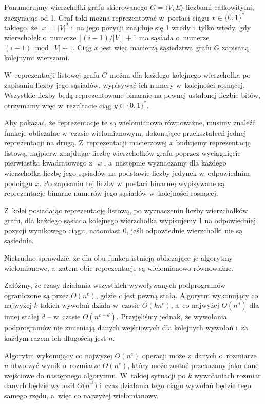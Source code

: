 \exercise %
Ponumerujmy wierzchołki grafu skierowanego $G=\langle V,E\rangle$ liczbami całkowitymi, zaczynając od 1.
Graf taki można reprezentować w~postaci ciągu $x\in\{0,1\}^*$ takiego, że $|x|=|V|^2$ i~na  jego pozycji znajduje się 1 wtedy i~tylko wtedy, gdy wierzchołek o~numerze $\lfloor(i-1)/|V|\rfloor+1$ ma sąsiada o~numerze $(i-1)\bmod|V|+1$.
Ciąg $x$ jest więc macierzą sąsiedztwa grafu $G$ zapisaną kolejnymi wierszami.

W~reprezentacji listowej grafu $G$ można dla każdego kolejnego wierzchołka po zapisaniu liczby jego sąsiadów, wypisywać ich numery w~kolejności rosnącej.
Wszystkie liczby będą reprezentowane binarnie na pewnej ustalonej liczbie bitów, otrzymamy więc w~rezultacie ciąg $y\in\{0,1\}^*$.

Aby pokazać, że reprezentacje te są wielomianowo równoważne, musimy znaleźć funkcje obliczalne w~czasie wielomianowym, dokonujące przekształceń jednej reprezentacji na drugą.
Z~reprezentacji macierzowej $x$ budujemy reprezentację listową, najpierw znajdując liczbę wierzchołków grafu poprzez wyciągnięcie pierwiastka kwadratowego z~$|x|$, a~następnie wyznaczamy dla każdego wierzchołka liczbę jego sąsiadów na podstawie liczby jedynek w~odpowiednim podciągu $x$.
Po zapisaniu tej liczby w~postaci binarnej wypisywane są reprezentacje binarne numerów jego sąsiadów w~kolejności rosnącej.

Z~kolei posiadając reprezentację listową, po wyznaczeniu liczby wierzchołków grafu, dla każdego sąsiada kolejnego wierzchołka wypisujemy 1 na odpowiedniej pozycji wynikowego ciągu, natomiast 0, jeśli odpowiednie wierzchołki nie są sąsiednie.

Nietrudno sprawdzić, że dla obu funkcji istnieją obliczające je algorytmy wielomianowe, a~zatem obie reprezentacje są wielomianowo równoważne.

\exercise %

\exercise %
Załóżmy, że czasy działania wszystkich wywoływanych podprogramów ograniczone są przez $O(n^c)$, gdzie $c$ jest pewną stałą.
Algorytm wykonujący co najwyżej $k$ takich wywołań działa w~czasie $O(kn^c)$, a~co najwyżej $O(n^d)$ dla innej stałej $d$ -- w~czasie $O(n^{c+d})$.
Przyjęliśmy jednak, że wywołania podprogramów nie zmieniają danych wejściowych dla kolejnych wywołań i~za każdym razem ich długością jest $n$.

Algorytm wykonujący co najwyżej $O(n^c)$ operacji może z~danych o~rozmiarze $n$ utworzyć wynik o~rozmiarze $O(n^c)$, który może zostać przekazany jako dane wejściowe do następnego algorytmu.
W~takiej sytuacji po $k$ wywołaniach rozmiar danych będzie wynosił $O\bigl(n^{c^k}\bigr)$ i~czas działania tego ciągu wywołań będzie tego samego rzędu, a~więc co najwyżej wielomianowy.

